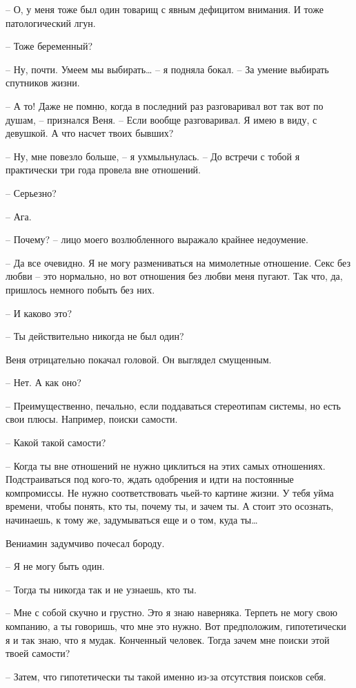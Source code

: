 \documentclass[
]{book}
\begin{document}
-- О, у меня тоже был один товарищ с явным дефицитом внимания. И тоже патологический лгун.

-- Тоже беременный?

-- Ну, почти. Умеем мы выбирать\ldots{} -- я подняла бокал. -- За умение выбирать спутников жизни.

-- А то! Даже не помню, когда в последний раз разговаривал вот так вот по душам, -- признался Веня. -- Если вообще разговаривал. Я имею в виду, с девушкой. А что насчет твоих бывших?

-- Ну, мне повезло больше, -- я ухмыльнулась. -- До встречи с тобой я практически три года провела вне отношений.

-- Серьезно?

-- Ага.

-- Почему? -- лицо моего возлюбленного выражало крайнее недоумение.

-- Да все очевидно. Я не могу размениваться на мимолетные отношение. Секс без любви -- это нормально, но вот отношения без любви меня пугают. Так что, да, пришлось немного побыть без них.

-- И каково это?

-- Ты действительно никогда не был один?

Веня отрицательно покачал головой. Он выглядел смущенным.

-- Нет. А как оно?

-- Преимущественно, печально, если поддаваться стереотипам системы, но есть свои плюсы. Например, поиски самости.

-- Какой такой самости?

-- Когда ты вне отношений не нужно циклиться на этих самых отношениях. Подстраиваться под кого-то, ждать одобрения и идти на постоянные компромиссы. Не нужно соответствовать чьей-то картине жизни. У тебя уйма времени, чтобы понять, кто ты, почему ты, и зачем ты. А стоит это осознать, начинаешь, к тому же, задумываться еще и о том, куда ты\ldots{}

Вениамин задумчиво почесал бороду.

-- Я не могу быть один.

-- Тогда ты никогда так и не узнаешь, кто ты.

-- Мне с собой скучно и грустно. Это я знаю наверняка. Терпеть не могу свою компанию, а ты говоришь, что мне это нужно. Вот предположим, гипотетически я и так знаю, что я мудак. Конченный человек. Тогда зачем мне поиски этой твоей самости?

-- Затем, что гипотетически ты такой именно из-за отсутствия поисков себя.
\end{document}
